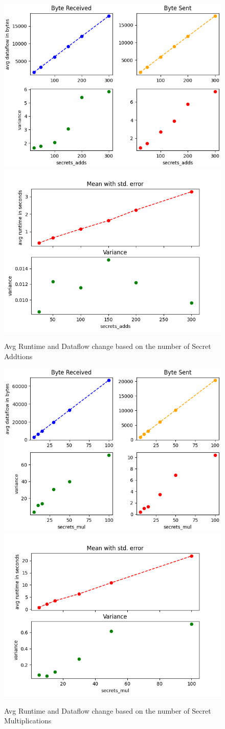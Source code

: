 \documentclass[10pt,conference,compsocconf]{IEEEtran}
\begin{document}
\begin{figure}[ht]
    \centering
    \includegraphics[width=0.49\linewidth]{../performance_analysis/dataflow_secrets_additions.png}
    \includegraphics[width=0.49\linewidth]{../performance_analysis/runtime_secrets_additions.png}
    \caption{Avg Runtime and Dataflow change based on the number of Secret Addtions}
    \label{fig:num_additions}
\end{figure}

\begin{figure}[h!]
    \includegraphics[width=0.49\linewidth]{../performance_analysis/dataflow_secrets_multiplications.png}
    \includegraphics[width=0.49\linewidth]{../performance_analysis/runtime_secrets_multiplications.png}
    \caption{Avg Runtime and Dataflow change based on the number of Secret Multiplications}
    \label{fig:num_multiplications}
\end{figure}
\end{document}
